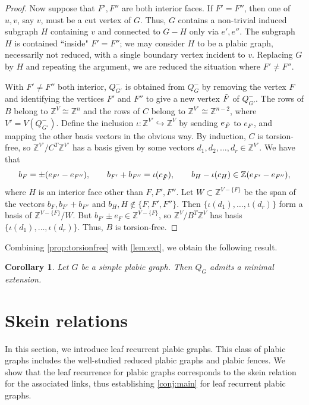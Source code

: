 \documentclass[11pt]{article}
\newtheorem{corollary}[theo]{Corollary}
\theoremstyle{definition}
\numberwithin{equation}{section}
\newcommand\Z{\mathbb{Z}}
\newcommand\QG{Q_G}
\newcommand\red{-}
\newcommand\Qred{Q^{\red}}
\newcommand\E{H}
\begin{document}
\begin{proof}
Now suppose that $F',F''$ are both interior faces.  If $F' = F''$, then one of $u,v$, say $v$, must be a cut vertex of $G$.  Thus, $G$ contains a non-trivial induced subgraph $H$ containing $v$ and connected to $G-H$ only via $e',e''$.  The subgraph $H$ is contained ``inside" $F'=F''$; we may consider $H$ to be a plabic graph, necessarily not reduced, with a single boundary vertex incident to $v$.  Replacing $G$ by $H$ and repeating the argument, we are reduced the situation where $F' \neq F''$.

With $F' \neq F''$ both interior, $\Qred_{G'}$ is obtained from $\Qred_G$ by removing the vertex $F$ and identifying the vertices $F'$ and $F''$ to give a new vertex $\tilde F$ of $\Qred_{G'}$.  The rows of $B$ belong to $\Z^V \cong \Z^n$ and the rows of $C$ belong to $\Z^{V'} \cong \Z^{n-2}$, where $V' = V(\Qred_{G'})$.  Define the inclusion $\iota: \Z^{V'} \hookrightarrow \Z^V$ by sending $e_{\tilde F}$ to $e_{F'}$, and mapping the other basis vectors in the obvious way.  By induction, $C$ is torsion-free, so $\Z^{V'}/C^T\Z^{V'}$ has a basis given by some vectors $d_1,d_2,\ldots,d_r \in \Z^{V'}$.  We have that 
$$
b_F = \pm(e_{F'} - e_{F''}), \qquad b_{F'} +b_{F''} = \iota(c_{\tF}), \qquad b_\E - \iota(c_\E) \in \Z(e_{F'} - e_{F''}),
$$
where $\E$ is an interior face other than $F,F',F''$.  Let $W \subset \Z^{V - \{F\}}$ be the span of the vectors $b_F, b_{F'} +b_{F''}$ and $b_\E, \E \notin \{F,F',F''\}$.  Then $\{\iota(d_1),\ldots,\iota(d_r)\}$ form a basis of $\Z^{V- \{F\}}/W$.
But $b_{F'} \pm e_F \in\Z^{V - \{F\}}$, so $\Z^V/B^T\Z^V$ has basis $\{\iota(d_1),\ldots,\iota(d_r)\}$.  Thus, $B$ is torsion-free.
\end{proof}
Combining \cref{prop:torsionfree} with \cref{lem:ext}, we obtain the following result.
\begin{corollary}\label{cor:ext_simple}
Let $G$ be a simple plabic graph. Then $\QG$ admits a minimal extension.
\end{corollary}

\section{Skein relations}
In this section, we introduce leaf recurrent plabic graphs.  This class of plabic graphs includes the well-studied reduced plabic graphs and plabic fences.  We show that the leaf recurrence for plabic graphs corresponds to the skein relation for the associated links, thus establishing \cref{conj:main} for leaf recurrent plabic graphs.
\end{document}
